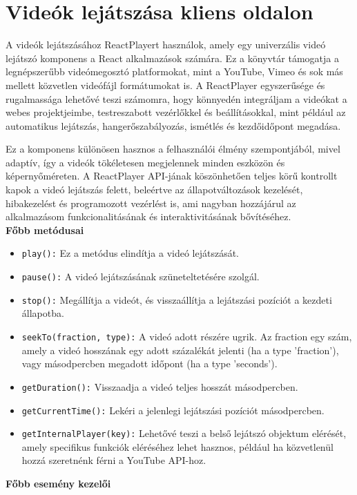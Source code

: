 \section{Videók lejátszása kliens oldalon}
A videók lejátszásához ReactPlayert használok, amely egy univerzális videó lejátszó komponens a React alkalmazások számára. Ez a könyvtár támogatja a legnépszerűbb videómegosztó platformokat, mint a YouTube, Vimeo és sok más mellett közvetlen videófájl formátumokat is. A ReactPlayer egyszerűsége és rugalmassága lehetővé teszi számomra, hogy könnyedén integráljam a videókat a webes projektjeimbe, testreszabott vezérlőkkel és beállításokkal, mint például az automatikus lejátszás, hangerőszabályozás, ismétlés és kezdőidőpont megadása.

Ez a komponens különösen hasznos a felhasználói élmény szempontjából, mivel adaptív, így a videók tökéletesen megjelennek minden eszközön és képernyőméreten. A ReactPlayer API-jának köszönhetően teljes körű kontrollt kapok a videó lejátszás felett, beleértve az állapotváltozások kezelését, hibakezelést és programozott vezérlést is, ami nagyban hozzájárul az alkalmazásom funkcionalitásának és interaktivitásának bővítéséhez.
\\
\textbf{Főbb metódusai}
\begin{itemize}
\item \texttt{play():} Ez a metódus elindítja a videó lejátszását.
\item \texttt{pause():} A videó lejátszásának szüneteltetésére szolgál.
\item \texttt{stop():} Megállítja a videót, és visszaállítja a lejátszási pozíciót a kezdeti állapotba.
\item \texttt{seekTo(fraction, type):}
A videó adott részére ugrik. Az fraction egy szám, amely a videó hosszának egy adott százalékát jelenti (ha a type 'fraction'), vagy másodpercben megadott időpont (ha a type 'seconds').
\item \texttt{getDuration():} Visszaadja a videó teljes hosszát másodpercben.
\item \texttt{getCurrentTime():} Lekéri a jelenlegi lejátszási pozíciót másodpercben.
\item \texttt{getInternalPlayer(key):}
Lehetővé teszi a belső lejátszó objektum elérését, amely specifikus funkciók eléréséhez lehet hasznos, például ha közvetlenül hozzá szeretnénk férni a YouTube API-hoz.
\end{itemize}
\textbf{Főbb esemény kezelői}

